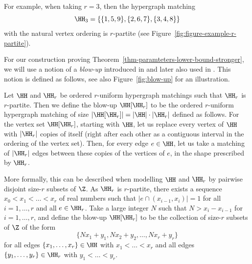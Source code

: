 For example, when taking $r=3$, then the hypergraph matching
\[
\HH_3 = \{ \{1,5,9\}, \{2,6,7\} ,\{3, 4,8\}\}
\]
with the natural vertex ordering is $r$-partite (see Figure~\ref{fig:figure-example-r-partite}).

For our construction proving Theorem~\ref{thm-paramteters-lower-bound-stronger}, we will use a notion of a {\em blow-up} introduced in \cite{DGR22} and later also used in \cite{AJKS}. This notion is defined as follows, see also Figure~\ref{fig:blow-up} for an illustration.

\begin{definition}\label{def-blow-up}
    Let $\HH$ and $\HH_r$ be ordered $r$-uniform hypergraph matchings such that $\HH_r$ is $r$-partite. Then we define the blow-up $\HH[\HH_r]$ to be the ordered $r$-uniform hypergraph matching of size $|\HH[\HH_r]|=|\HH|\cdot |\HH_r|$ defined as follows. For the vertex set $\HH[\HH_r]$, starting with $\HH$, let us replace every vertex of $\HH$ with $|\HH_r|$ copies of itself (right after each other as a contiguous interval in the ordering of the vertex set). Then, for every edge $e\in \HH$, let us take a matching of $|\HH_r|$ edges between these copies of the vertices of $e$, in the shape prescribed by $\HH_r$.

    More formally, this can be described when modelling $\HH$ and $\HH_r$ by pairwise disjoint size-$r$ subsets of $\Z$. As $\HH_r$ is $r$-partite, there exists a sequence $x_0 < x_1 < \ldots < x_r$ of real numbers such that $|e\cap (x_{i-1},x_i)|=1$ for all $i=1,\dots,r$ and all $e\in \HH_r$. Take a large integer $N$ such that $N>x_i-x_{i-1}$ for $i=1,\dots,r$, and define the blow-up $\HH[\HH_r]$ to be the collection of size-$r$ subsets of $\Z$ of the form
    \[\{ N x_1 + y_1, N x_2 + y_2, \ldots, N x_r + y_r \}\]
    for all edges $\{x_1,\dots,x_r\}\in \HH$ with $x_1<\dots<x_r$ and all edges $\{y_1,\dots,y_r\}\in \HH_r$ with $y_1<\dots<y_r$.
\end{definition}

